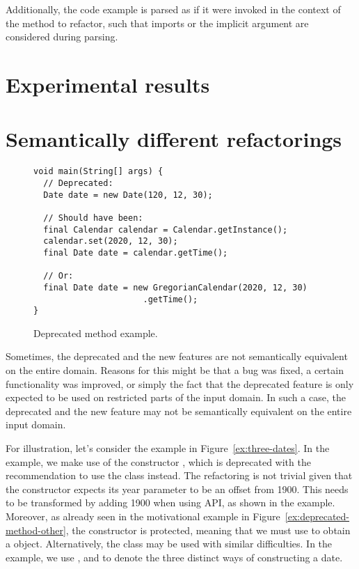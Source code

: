 \documentclass[sigconf,review,anonymous]{acmart}
\begin{document}
Additionally, the code example is parsed as if it were invoked in the context of
the method to refactor, such that imports or the implicit  argument
are considered during parsing.

\section{Experimental results}\label{sec:experimental-results}

\section{Semantically different refactorings}


\begin{figure}
\begin{lstlisting}[mathescape=true,showstringspaces=false]
void main(String[] args) {
  // Deprecated:
  Date date = new Date(120, 12, 30);
 
  // Should have been:
  final Calendar calendar = Calendar.getInstance();
  calendar.set(2020, 12, 30);
  final Date date = calendar.getTime();

  // Or:
  final Date date = new GregorianCalendar(2020, 12, 30)
                      .getTime();
}
\end{lstlisting}
\caption{Deprecated method example.}
\label{ex:deprecated-method}
\end{figure}


Sometimes, the deprecated and the new features are not semantically
equivalent on the entire domain. Reasons for this might be that a bug
was fixed, a certain functionality was improved, or simply the fact
that the deprecated feature is only expected to be used on restricted
parts of the input domain. In such a case, the deprecated and the new
feature may not be semantically equivalent on the entire input domain.

For illustration, let's consider the example in Figure~\ref{ex:three-dates}.
In the example, we make use of the constructor , 
which is deprecated with the 
recommendation to use the  class instead.
The refactoring is not trivial given that the 
 constructor expects its year parameter to be an offset
from 1900.  This needs to be
transformed by adding 1900 when using  API, as shown in the
example. Moreover, as already seen in the motivational example in  Figure~\ref{ex:deprecated-method-other},
the  constructor is protected,
meaning that we must use  to obtain a
 object.
Alternatively, the  class may be used with
similar difficulties.
In the example, we use ,  and  to denote the three distinct ways of constructing a date.
\end{document}
